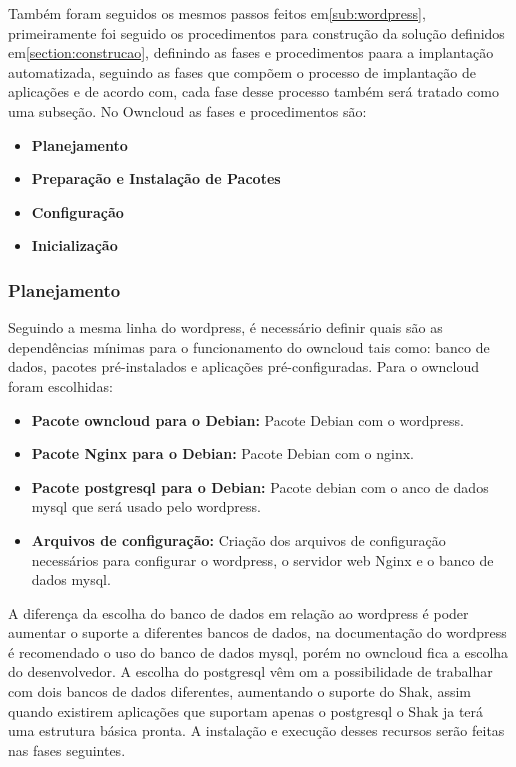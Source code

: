 Também foram seguidos os mesmos passos feitos em\ref{sub:wordpress}, primeiramente
foi seguido os procedimentos para construção da solução definidos em\ref{section:construcao},
definindo as fases e procedimentos paara a implantação automatizada, seguindo as
fases que compõem o processo de implantação de aplicações e de acordo com\cite{omg2006},
cada fase desse processo também será tratado como uma subseção. No Owncloud as
fases e procedimentos são:

\begin{itemize}
  \item  \textbf{Planejamento}
  \item  \textbf{Preparação e Instalação de Pacotes}
  \item  \textbf{Configuração}
  \item  \textbf{Inicialização}
\end{itemize}

\subsubsection{Planejamento}

Seguindo a mesma linha do wordpress, é necessário definir quais são as dependências
mínimas para o funcionamento do owncloud tais como: banco de dados, pacotes
pré-instalados e aplicações pré-configuradas. Para o owncloud foram escolhidas:

\begin{itemize}
   \item \textbf{Pacote owncloud para o Debian:} Pacote Debian com o wordpress.
   \item \textbf{Pacote Nginx para o Debian:} Pacote Debian com o nginx.
   \item \textbf{Pacote postgresql para o Debian:} Pacote debian com o anco de dados mysql
   que será usado pelo wordpress.
   \item \textbf{Arquivos de configuração:} Criação dos arquivos de configuração
   necessários para configurar o wordpress, o servidor web Nginx e o banco de dados
   mysql.
\end{itemize}

A diferença da escolha do banco de dados em relação ao wordpress é poder aumentar
o suporte a diferentes bancos de dados, na documentação do wordpress é recomendado
o uso do banco de dados mysql, porém no owncloud fica a escolha do desenvolvedor.
A escolha do postgresql vêm om a possibilidade de trabalhar com dois bancos de
dados diferentes, aumentando o suporte do Shak, assim quando existirem aplicações
que suportam apenas o postgresql o Shak ja terá uma estrutura básica pronta.
A instalação e execução desses recursos serão feitas nas fases seguintes.

